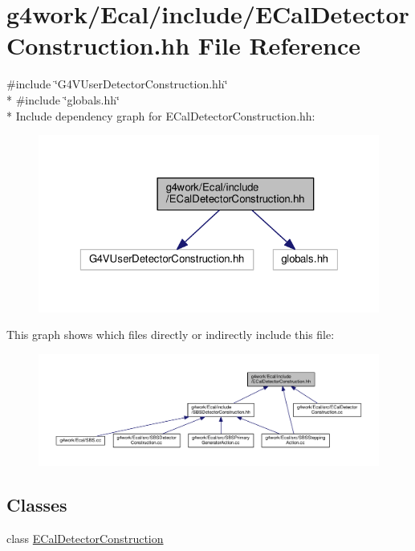 \hypertarget{_e_cal_detector_construction_8hh}{\section{g4work/\-Ecal/include/\-E\-Cal\-Detector\-Construction.hh File Reference}
\label{_e_cal_detector_construction_8hh}
}
{\ttfamily \#include \char`\"{}G4\-V\-User\-Detector\-Construction.\-hh\char`\"{}}\\*
{\ttfamily \#include \char`\"{}globals.\-hh\char`\"{}}\\*
Include dependency graph for E\-Cal\-Detector\-Construction.\-hh\-:\nopagebreak
\begin{figure}[H]
\begin{center}
\leavevmode
\includegraphics[width=323pt]{_e_cal_detector_construction_8hh__incl}
\end{center}
\end{figure}
This graph shows which files directly or indirectly include this file\-:\nopagebreak
\begin{figure}[H]
\begin{center}
\leavevmode
\includegraphics[width=350pt]{_e_cal_detector_construction_8hh__dep__incl}
\end{center}
\end{figure}
\subsection*{Classes}
\begin{DoxyCompactItemize}
\item 
class \hyperlink{class_e_cal_detector_construction}{E\-Cal\-Detector\-Construction}
\end{DoxyCompactItemize}
